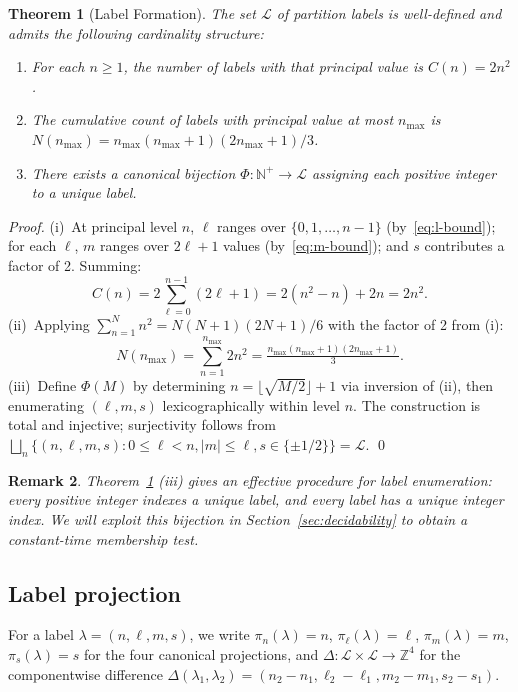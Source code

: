 \documentclass[twocolumn,11pt,a4paper]{article}
\newtheorem{theorem}{Theorem}[section]
\newtheorem{remark}[theorem]{Remark}
\newcommand{\Natural}{\mathbb{N}}
\newcommand{\Integer}{\mathbb{Z}}
\newcommand{\Lab}{\mathcal{L}}
\begin{document}
\begin{theorem}[Label Formation]
\label{thm:label-formation}
The set $\Lab$ of partition labels is well-defined and admits the following cardinality structure:
\begin{enumerate}[nosep,leftmargin=*]
\item For each $n \geq 1$, the number of labels with that principal value is $C(n) = 2n^2$.
\item The cumulative count of labels with principal value at most $n_{\max}$ is $N(n_{\max}) = n_{\max}(n_{\max}+1)(2n_{\max}+1)/3$.
\item There exists a canonical bijection $\Phi : \Natural^+ \to \Lab$ assigning each positive integer to a unique label.
\end{enumerate}
\end{theorem}

\begin{proof}
(i)~At principal level $n$, $\ell$ ranges over $\{0, 1, \ldots, n-1\}$ (by~\eqref{eq:l-bound}); for each $\ell$, $m$ ranges over $2\ell + 1$ values (by~\eqref{eq:m-bound}); and $s$ contributes a factor of 2. Summing:
\[
C(n) = 2 \sum_{\ell=0}^{n-1}(2\ell + 1) = 2(n^2 - n) + 2n = 2n^2.
\]
(ii)~Applying $\sum_{n=1}^{N} n^2 = N(N+1)(2N+1)/6$ with the factor of 2 from (i):
\[
N(n_{\max}) = \sum_{n=1}^{n_{\max}} 2n^2 = \tfrac{n_{\max}(n_{\max}+1)(2n_{\max}+1)}{3}.
\]
(iii)~Define $\Phi(M)$ by determining $n = \lfloor \sqrt{M/2}\rfloor + 1$ via inversion of (ii), then enumerating $(\ell, m, s)$ lexicographically within level $n$. The construction is total and injective; surjectivity follows from $\bigsqcup_n \{(n, \ell, m, s) : 0 \leq \ell < n, |m|\leq\ell, s \in \{\pm 1/2\}\} = \Lab$. \qed
\end{proof}

\begin{remark}
Theorem~\ref{thm:label-formation} (iii) gives an effective procedure for label enumeration: every positive integer indexes a unique label, and every label has a unique integer index. We will exploit this bijection in Section~\ref{sec:decidability} to obtain a constant-time membership test.
\end{remark}

\subsection{Label projection}

For a label $\lambda = (n, \ell, m, s)$, we write $\pi_n(\lambda) = n$, $\pi_\ell(\lambda) = \ell$, $\pi_m(\lambda) = m$, $\pi_s(\lambda) = s$ for the four canonical projections, and $\Delta : \Lab \times \Lab \to \Integer^4$ for the componentwise difference $\Delta(\lambda_1, \lambda_2) = (n_2 - n_1, \ell_2 - \ell_1, m_2 - m_1, s_2 - s_1)$.
\end{document}
